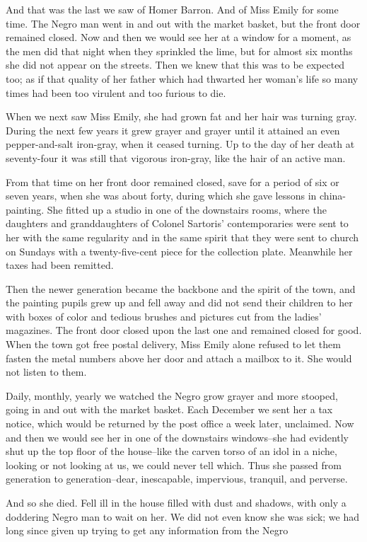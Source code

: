 \documentclass[10pt,a4paper]{article}
\begin{document}
And that was the last we saw of Homer Barron. And of Miss Emily for some time. The Negro man went in and out with the market basket, but the front door remained closed. Now and then we would see her at a window for a moment, as the men did that night when they sprinkled the lime, but for almost six months she did not appear on the streets. Then we knew that this was to be expected too; as if that quality of her father which had thwarted her woman's life so many times had been too virulent and too furious to die.

When we next saw Miss Emily, she had grown fat and her hair was turning gray. During the next few years it grew grayer and grayer until it attained an even pepper-and-salt iron-gray, when it ceased turning. Up to the day of her death at seventy-four it was still that vigorous iron-gray, like the hair of an active man.

From that time on her front door remained closed, save for a period of six or seven years, when she was about forty, during which she gave lessons in china-painting. She fitted up a studio in one of the downstairs rooms, where the daughters and granddaughters of Colonel Sartoris' contemporaries were sent to her with the same regularity and in the same spirit that they were sent to church on Sundays with a twenty-five-cent piece for the collection plate. Meanwhile her taxes had been remitted.

Then the newer generation became the backbone and the spirit of the town, and the painting pupils grew up and fell away and did not send their children to her with boxes of color and tedious brushes and pictures cut from the ladies' magazines. The front door closed upon the last one and remained closed for good. When the town got free postal delivery, Miss Emily alone refused to let them fasten the metal numbers above her door and attach a mailbox to it. She would not listen to them.

Daily, monthly, yearly we watched the Negro grow grayer and more stooped, going in and out with the market basket. Each December we sent her a tax notice, which would be returned by the post office a week later, unclaimed. Now and then we would see her in one of the downstairs windows--she had evidently shut up the top floor of the house--like the carven torso of an idol in a niche, looking or not looking at us, we could never tell which. Thus she passed from generation to generation--dear, inescapable, impervious, tranquil, and perverse.

And so she died. Fell ill in the house filled with dust and shadows, with only a doddering Negro man to wait on her. We did not even know she was sick; we had long since given up trying to get any information from the Negro
\end{document}
